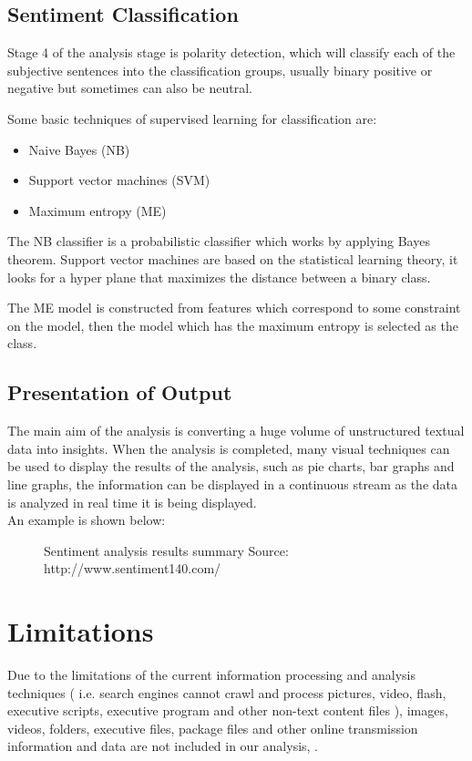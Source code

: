 \subsection{Sentiment Classification}
Stage 4 of the analysis stage is polarity detection, which will classify each of the subjective sentences into the classification groups, usually binary positive or negative but sometimes can also be neutral.

Some basic techniques of supervised learning for classification are:
\begin{itemize}
\item Naive Bayes (NB)
\item Support vector machines (SVM)
\item Maximum entropy (ME)
\end{itemize}
The NB classifier is a probabilistic classifier which works by applying Bayes theorem.
Support vector machines are based on the statistical learning theory, it looks for a hyper plane that maximizes the distance between a binary class.

The ME model is constructed from features which correspond to some constraint on the model, then the model which has the maximum entropy is selected as the class.

\clearpage
\subsection{Presentation of Output}
The main aim of the analysis is converting a huge volume of unstructured textual data into insights. When the analysis is completed, many visual techniques can be used to display the results of the analysis, such as pie charts, bar graphs and line graphs, the information can be displayed in a continuous stream as the data is analyzed in real time it is being displayed.\\

An example is shown below:

\begin{figure}[h]
  \centering
  \caption[example of sentiment analysis results]%
  {Sentiment analysis results summary Source: http://www.sentiment140.com/ }
  \label{fig:ALAP:sm3}
\end{figure}




\section{Limitations}
Due to the limitations of the current information processing and analysis techniques ( i.e. search
engines cannot crawl and process pictures, video, flash, executive scripts, executive program and
other non-text content files ), images, videos, folders, executive files, package files and other
online transmission information and data are not included in our analysis, \cite{ref22}.



